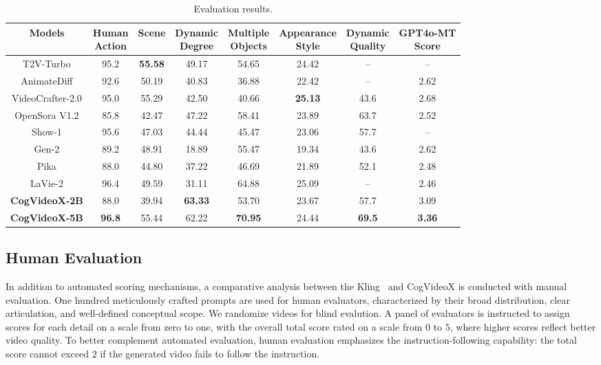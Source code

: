 \documentclass{article} \usepackage{iclr2024_conference,times}
\begin{document}
\begin{table}[t]
\caption{Evaluation results.}
\label{table:results}
\vspace{6pt}
\footnotesize
    \centering
    \begin{tabular}{cccccccc}
   \toprule
        Models & \Centerstack{Human \\Action}   & Scene & \Centerstack{Dynamic \\Degree} & \Centerstack{Multiple \\Objects} & \Centerstack{Appearance \\Style} & \Centerstack{Dynamic \\Quality} & \Centerstack{GPT4o-MT \\Score}  \\ 
        \midrule
        T2V-Turbo & 95.2 & \textbf{55.58} & 49.17 & 54.65 & 24.42 & -- & --  \\ 
        AnimateDiff & 92.6  & 50.19 & 40.83 & 36.88 & 22.42 & -- & 2.62  \\ 
        VideoCrafter-2.0 & 95.0  & 55.29 & 42.50 & 40.66 & \textbf{25.13} & 43.6 & 2.68  \\ 
        OpenSora V1.2 & 85.8  & 42.47 & 47.22 & 58.41  & 23.89 & 63.7 & 2.52  \\ 
        Show-1 & 95.6  & 47.03 & 44.44 & 45.47  & 23.06 & 57.7 & --  \\ 
        Gen-2 & 89.2  & 48.91 & 18.89 & 55.47 & 19.34 & 43.6 & 2.62  \\ 
        Pika & 88.0  & 44.80 & 37.22 & 46.69  & 21.89 & 52.1 & 2.48  \\ 
        LaVie-2 & 96.4 & 49.59 & 31.11 & 64.88  & 25.09 & -- & 2.46  \\ 
        \hline
        \textbf{CogVideoX-2B} & 88.0 & 39.94 & \textbf{63.33} & 53.70 & 23.67 & 57.7 & 3.09 \\
        \textbf{CogVideoX-5B} & \textbf{96.8} & 55.44 & 62.22 & \textbf{70.95} & 24.44 & \textbf{69.5} & \textbf{3.36} \\
        \bottomrule
    \end{tabular}
\end{table} 

\subsection{Human Evaluation}
In addition to automated scoring mechanisms, a comparative analysis between the Kling~\cite{kling} and CogVideoX is conducted with manual evaluation. 
One hundred meticulously crafted prompts are used for human evaluators, characterized by their broad distribution, clear articulation, and well-defined conceptual scope. 
We randomize videos for blind evalution. 
A panel of evaluators is instructed to assign scores for each detail on a scale from zero to one, with the overall total score rated on a scale from $0$ to $5$, where higher scores reflect better video quality. 
To better complement automated evaluation, human evaluation emphasizes the instruction-following capability: the total score cannot exceed $2$ if the generated video fails to follow the instruction.
\end{document}
